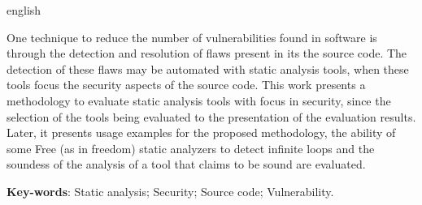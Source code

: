 \begin{resumo}[Abstract]
 \begin{otherlanguage*}{english}

   One technique to reduce the number of vulnerabilities found in software is
   through the detection and resolution of flaws present in its the source code.
   The detection of these flaws may be automated with static analysis tools,
   when these tools focus the security aspects of the source code. This work
   presents a methodology to evaluate static analysis tools with focus in
   security, since the selection of the tools being evaluated to the
   presentation of the evaluation results. Later, it presents usage examples
   for the proposed methodology, the ability of some Free (as in freedom) static
   analyzers to detect infinite loops and the soundess of the analysis of a tool
   that claims to be sound are evaluated. 

   \vspace{\onelineskip}
 
   \noindent 
   \textbf{Key-words}: Static analysis; Security; Source code; Vulnerability.
 \end{otherlanguage*}
\end{resumo}
